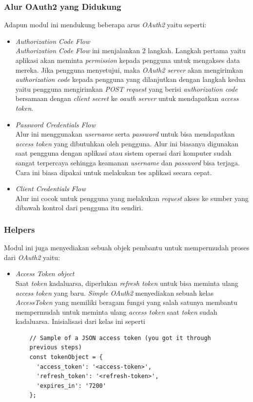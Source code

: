 \subsubsection{Alur OAuth2 yang Didukung}
Adapun modul ini mendukung beberapa arus \textit{OAuth2} yaitu seperti:
\begin{itemize}
    \item \textit{Authorization Code Flow}\\
    \textit{Authorization Code Flow} ini menjalankan 2 langkah. Langkah pertama yaitu aplikasi akan meminta \textit{permission} kepada pengguna untuk mengakses data mereka. Jika pengguna menyetujui, maka \textit{OAuth2 server} akan mengirimkan \textit{authorization code} kepada pengguna yang dilanjutkan dengan langkah kedua yaitu pengguna mengirimkan \textit{POST request} yang berisi \textit{authorization code} bersamaan dengan \textit{client secret} ke \textit{oauth server} untuk mendapatkan \textit{access token}. 
    
    \item \textit{Password Credentials Flow}\\
    Alur ini menggunakan \textit{username} serta \textit{password} untuk bisa mendapatkan \textit{access token} yang dibutuhkan oleh pengguna. Alur ini biasanya digunakan saat pengguna dengan aplikasi atau sistem operasi dari komputer sudah sangat terpercaya sehingga keamanan \textit{username} dan \textit{password} bisa terjaga. Cara ini biasa dipakai untuk melakukan tes aplikasi secara cepat. 
    
    \item \textit{Client Credentials Flow}\\
    Alur ini cocok untuk pengguna yang melakukan \textit{request} akses ke sumber yang dibawah kontrol dari pengguna itu sendiri. 
\end{itemize}

\subsubsection{Helpers}
Modul ini juga menyediakan sebuah objek pembantu untuk mempermudah proses dari \textit{OAuth2} yaitu:
\begin{itemize}
    \item \textit{Access Token object}\\
    Saat \textit{token} kadaluarsa, diperlukan \textit{refresh token} untuk bisa meminta ulang \textit{access token} yang baru. \textit{Simple OAuth2} menyediakan sebuah kelas \textit{AccessToken} yang memiliki beragam fungsi yang salah satunya membantu mempermudah untuk meminta ulang \textit{access token} saat \textit{token} sudah kadaluarsa. Inisialisasi dari kelas ini seperti 
    
    \begin{lstlisting}
    // Sample of a JSON access token (you got it through
    previous steps)
    const tokenObject = {
      'access_token': '<access-token>',
      'refresh_token': '<refresh-token>',
      'expires_in': '7200'
    };
    \end{lstlisting}
\end{itemize}

